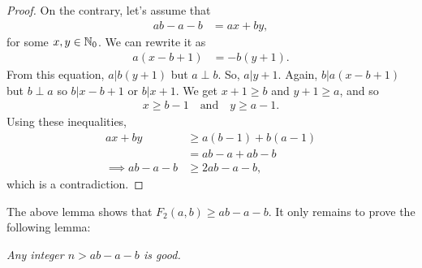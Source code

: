 \documentclass{subfile}
\begin{document}
	\begin{proof}
		On the contrary, let's assume that
			\begin{align*}
				ab-a-b & = ax+by,
			\end{align*}
		for some $x,y\in\mathbb{N}_0$. We can rewrite it as
			\begin{align*}
				a(x-b+1) & = -b(y+1).
			\end{align*}
		From this equation, $a|b(y+1)$ but $a\perp b$. So, $a|y+1$. Again, $b|a(x-b+1)$ but $b\perp a$ so $b|x-b+1$ or $b|x+1$. We get $x+1\geq b$ and $y+1\geq a$, and so
			\begin{align*}
				 x\geq b-1 \quad \text{and} \quad y \geq a-1.
			\end{align*}
		Using these inequalities,
			\begin{align*}
				 ax+by & \geq a(b-1)+b(a-1) \\
				&= ab-a+ab-b\\
				\implies   ab-a-b & \geq 2ab-a-b,
			\end{align*}
		which is a contradiction.
	\end{proof}
	
%	
%	
%	
The above lemma shows that $F_2(a,b) \geq ab-a-b$. It only remains to prove the following lemma:
	\begin{lemma}\slshape
		Any integer $n>ab-a-b$ is good.
	\end{lemma}
	
\end{document}
